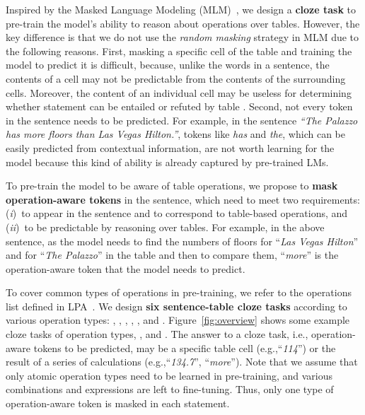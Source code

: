 \documentclass[11pt]{article}
\newcommand{\eg}{{e.g.,}\xspace}
\newcommand{\ie}{{i.e.,}\xspace}
\newcommand{\term}[1]{\xspace}
\begin{document}
Inspired by the Masked Language Modeling (MLM)~\cite{bert}, we design a \textbf{cloze task} to pre-train the model's ability to reason about operations over tables.
However, the key difference is that we do not use the \emph{random masking} strategy in MLM due to the following reasons.
First, masking a specific cell of the table and training the model to predict it is difficult, because, unlike the words in a sentence, the contents of a cell may not be predictable from the contents of the surrounding cells. Moreover, the content of an individual cell may be useless for determining whether statement  can be entailed or refuted by table .
Second, not every token in the sentence needs to be predicted. For example, in the sentence \textit{``The Palazzo has more floors than Las Vegas Hilton.''}, tokens like \textit{has} and \textit{the}, which can be easily predicted from contextual information, are not worth learning for the model because this kind of ability is already captured by pre-trained LMs.





To pre-train the model to be aware of table operations, we propose to \textbf{mask operation-aware tokens} in the sentence, which
need to meet two requirements: (\emph{i})~to appear in the sentence and to correspond to table-based operations, and (\emph{ii})~to be predictable by reasoning over tables. For example, in the above sentence, as the model needs to find the numbers of floors for ``\textit{Las Vegas Hilton}'' and for ``\textit{The Palazzo}'' in the table and then to compare them, ``\textit{more}'' is the operation-aware token that the model needs to predict.



To cover common types of operations in pre-training, we refer to the operations list defined in LPA~\cite{tabfact}. We design \textbf{six sentence-table cloze tasks} according to various operation types: \term{Filter}, \term{Aggregation}, \term{Superlative}, \term{Comparative}, \term{Ordinal}, and \term{Unique}. Figure~\ref{fig:overview} shows some example cloze tasks of operation types, \term{Filter}, \term{Aggregation} and \term{Comparative}. The answer to a cloze task, \ie operation-aware tokens to be predicted, may be a specific table cell (\eg ``\emph{114}'') or the result of a series of calculations (\eg ``\emph{134.7}'', ``\emph{more}'').
Note that we assume that only atomic operation types need to be learned in pre-training, and various combinations and expressions are left to fine-tuning. 
Thus, only one type of operation-aware token is masked in each statement.
\end{document}
